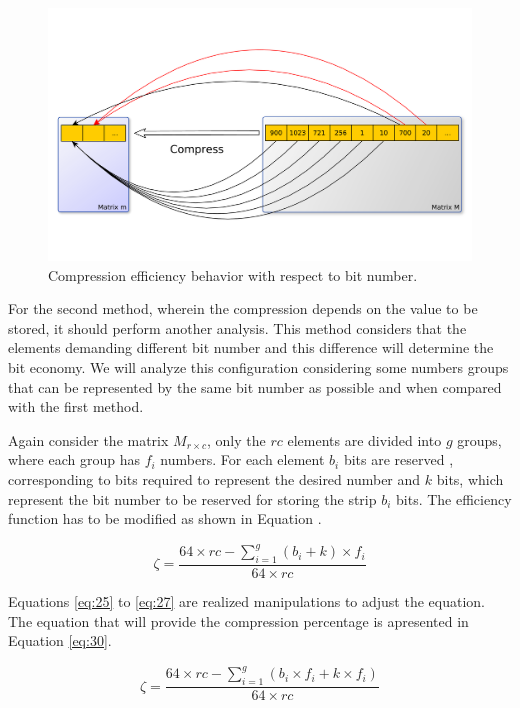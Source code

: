 \documentclass[10pt]{article}
\begin{document}
\begin{figure}[h]
 \centering
 \includegraphics[scale=0.5]{fig01}
 \caption{Compression efficiency behavior with respect to bit number.}
 \label{fig:01}
\end{figure}

For the second method, wherein the compression depends on the value to be stored, it should perform another analysis. This method considers that the elements demanding different bit number and this difference will determine the bit economy. We will analyze this configuration considering some numbers groups that can be represented by the same bit number as possible and when compared with the first method.

Again consider the matrix $M_{r \times c}$, only the $rc$ elements are divided into $g$ groups, where each group has $f_i$ numbers. For each element $b_i$ bits are reserved , corresponding to bits required to represent the desired number and $k$ bits, which represent the bit number to be reserved for storing the strip $b_i$ bits. The efficiency function has to be modified as shown in Equation \label{eq:24}.

\begin{equation}\label{eq:24}
 \zeta = \frac{64 \times rc - \sum_{i=1}^{g} ( b_i + k ) \times f_i }{64 \times rc} 
\end{equation}

Equations \ref{eq:25} to \ref{eq:27} are realized manipulations to adjust the equation. The equation that will provide the compression percentage  is apresented in Equation \ref{eq:30}.

\begin{equation} \label{eq:25}
 \zeta = \frac{64 \times rc - \sum_{i=1}^{g} ( b_i \times f_i + k \times f_i )}{64 \times rc} 
\end{equation}
\end{document}
